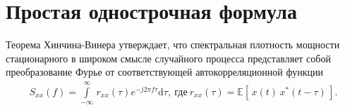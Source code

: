 \documentclass{article}
\begin{document}
\section{Простая однострочная формула}

Теорема Хинчина-Винера утверждает, что спектральная плотность мощности стационарного в широком смысле случайного процесса представляет собой преобразование Фурье от соответствующей автокорреляционной функции
\begin{align*}
    S_{xx}(f) = \int\limits_{-\infty}^{\infty}  \, r_{xx} (\tau) e^{-j 2 \pi f \tau} \mathrm{d} \tau,\ \text{где}\ r_{xx}(\tau) = \mathbb{E}[\,x(t) \, x^{*}(t - \tau)\,].
\end{align*}
\end{document}

